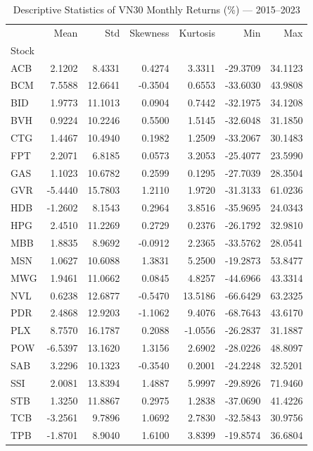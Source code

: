 \begin{table}[h]\centering\small
\caption{Descriptive Statistics of VN30 Monthly Returns (\%) — 2015–2023}
\begin{tabular}{lrrrrrr}
\toprule
 & Mean & Std & Skewness & Kurtosis & Min & Max \\
Stock &  &  &  &  &  &  \\
\midrule
ACB & 2.1202 & 8.4331 & 0.4274 & 3.3311 & -29.3709 & 34.1123 \\
BCM & 7.5588 & 12.6641 & -0.3504 & 0.6553 & -33.6030 & 43.9808 \\
BID & 1.9773 & 11.1013 & 0.0904 & 0.7442 & -32.1975 & 34.1208 \\
BVH & 0.9224 & 10.2246 & 0.5500 & 1.5145 & -32.6048 & 31.1850 \\
CTG & 1.4467 & 10.4940 & 0.1982 & 1.2509 & -33.2067 & 30.1483 \\
FPT & 2.2071 & 6.8185 & 0.0573 & 3.2053 & -25.4077 & 23.5990 \\
GAS & 1.1023 & 10.6782 & 0.2599 & 0.1295 & -27.7039 & 28.3504 \\
GVR & -5.4440 & 15.7803 & 1.2110 & 1.9720 & -31.3133 & 61.0236 \\
HDB & -1.2602 & 8.1543 & 0.2964 & 3.8516 & -35.9695 & 24.0343 \\
HPG & 2.4510 & 11.2269 & 0.2729 & 0.2376 & -26.1792 & 32.9810 \\
MBB & 1.8835 & 8.9692 & -0.0912 & 2.2365 & -33.5762 & 28.0541 \\
MSN & 1.0627 & 10.6088 & 1.3831 & 5.2500 & -19.2873 & 53.8477 \\
MWG & 1.9461 & 11.0662 & 0.0845 & 4.8257 & -44.6966 & 43.3314 \\
NVL & 0.6238 & 12.6877 & -0.5470 & 13.5186 & -66.6429 & 63.2325 \\
PDR & 2.4868 & 12.9203 & -1.1062 & 9.4076 & -68.7643 & 43.6170 \\
PLX & 8.7570 & 16.1787 & 0.2088 & -1.0556 & -26.2837 & 31.1887 \\
POW & -6.5397 & 13.1620 & 1.3156 & 2.6902 & -28.0226 & 48.8097 \\
SAB & 3.2296 & 10.1323 & -0.3540 & 0.2001 & -24.2248 & 32.5201 \\
SSI & 2.0081 & 13.8394 & 1.4887 & 5.9997 & -29.8926 & 71.9460 \\
STB & 1.3250 & 11.8867 & 0.2975 & 1.2838 & -37.0690 & 41.4226 \\
TCB & -3.2561 & 9.7896 & 1.0692 & 2.7830 & -32.5843 & 30.9756 \\
TPB & -1.8701 & 8.9040 & 1.6100 & 3.8399 & -19.8574 & 36.6804 \\

\end{tabular}
\end{table}
